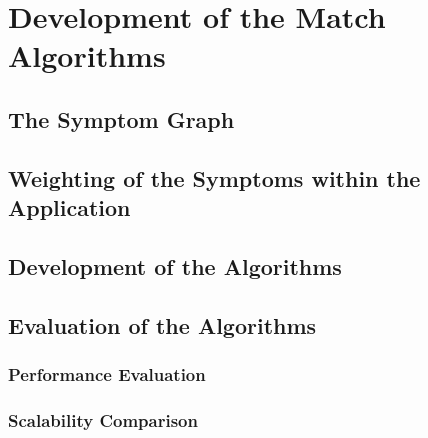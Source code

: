 

\chapter{Development of the Match Algorithms}
\section{The Symptom Graph}
\section{Weighting of the Symptoms within the Application}
\section{Development of the Algorithms}
\section{Evaluation of the Algorithms}
\subsection{Performance Evaluation}
\subsection{Scalability Comparison}


